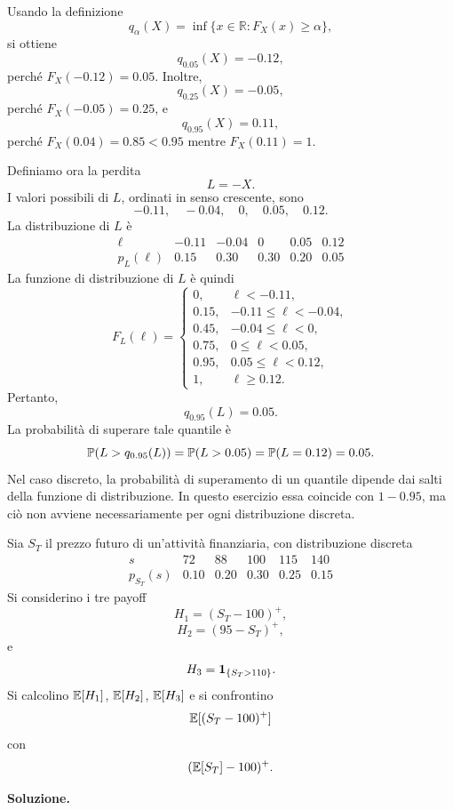 Usando la definizione
\[
q_\alpha(X)=\inf\{x\in\mathbb{R}:F_X(x)\geq \alpha\},
\]
si ottiene
\[
q_{0.05}(X)=-0.12,
\]
perch\'{e} $F_X(-0.12)=0.05$. Inoltre,
\[
q_{0.25}(X)=-0.05,
\]
perch\'{e} $F_X(-0.05)=0.25$, e
\[
q_{0.95}(X)=0.11,
\]
perch\'{e} $F_X(0.04)=0.85<0.95$ mentre $F_X(0.11)=1$.

Definiamo ora la perdita
\[
L=-X.
\]
I valori possibili di $L$, ordinati in senso crescente, sono
\[
-0.11,\quad -0.04,\quad 0,\quad 0.05,\quad 0.12.
\]
La distribuzione di $L$ \`{e}
\[
\begin{array}{c|ccccc}
\ell & -0.11 & -0.04 & 0 & 0.05 & 0.12\\
\hline
p_L(\ell) & 0.15 & 0.30 & 0.30 & 0.20 & 0.05
\end{array}
\]
La funzione di distribuzione di $L$ \`{e} quindi
\[
F_L(\ell)=
\begin{cases}
0, & \ell<-0.11,\\
0.15, & -0.11\leq \ell<-0.04,\\
0.45, & -0.04\leq \ell<0,\\
0.75, & 0\leq \ell<0.05,\\
0.95, & 0.05\leq \ell<0.12,\\
1, & \ell\geq 0.12.
\end{cases}
\]
Pertanto,
\[
q_{0.95}(L)=0.05.
\]
La probabilit\`{a} di superare tale quantile \`{e}
\[
\mathbb{P}(L>q_{0.95}(L))
=
\mathbb{P}(L>0.05)
=
\mathbb{P}(L=0.12)
=
0.05.
\]
Nel caso discreto, la probabilit\`{a} di superamento di un quantile dipende dai
salti della funzione di distribuzione. In questo esercizio essa coincide con
$1-0.95$, ma ci\`{o} non avviene necessariamente per ogni distribuzione discreta.

\begin{exercise}
\label{ex:cap2-payoff-non-lineari}

Sia $S_T$ il prezzo futuro di un'attivit\`{a} finanziaria, con distribuzione
discreta
\[
\begin{array}{c|ccccc}
s & 72 & 88 & 100 & 115 & 140\\
\hline
p_{S_T}(s) & 0.10 & 0.20 & 0.30 & 0.25 & 0.15
\end{array}
\]
Si considerino i tre payoff
\[
H_1=(S_T-100)^+,
\]
\[
H_2=(95-S_T)^+,
\]
e
\[
H_3=\mathbf{1}_{\{S_T>110\}}.
\]
Si calcolino $\mathbb{E}[H_1]$, $\mathbb{E}[H_2]$, $\mathbb{E}[H_3]$ e si confrontino
\[
\mathbb{E}[(S_T-100)^+]
\]
con
\[
(\mathbb{E}[S_T]-100)^+.
\]

\end{exercise}

\noindent
\textbf{Soluzione.}

